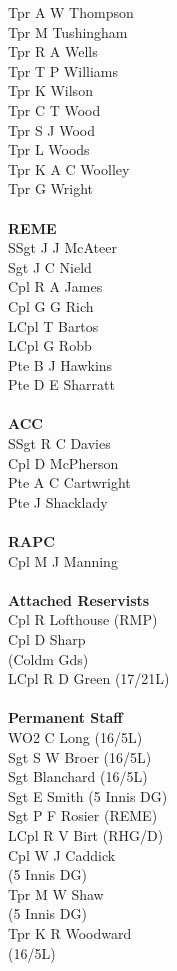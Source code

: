 \begin{multicols}{4}
  Tpr A W Thompson \\
  Tpr M Tushingham \\
  Tpr R A Wells \\
  Tpr T P Williams \\
  Tpr K Wilson \\
  Tpr C T Wood \\
  Tpr S J Wood \\
  Tpr L Woods \\
  Tpr K A C Woolley \\
  Tpr G Wright \\
  \\
  \textbf{REME} \\
  SSgt J J McAteer \\
  Sgt J C Nield \\
  Cpl R A James \\
  Cpl G G Rich \\
  LCpl T Bartos \\
  LCpl G Robb \\
  Pte B J Hawkins \\
  Pte D E Sharratt \\
  \\
  \textbf{ACC} \\
  SSgt R C Davies \\
  Cpl D McPherson \\
  Pte A C Cartwright \\
  Pte J Shacklady \\
  \\
  \textbf{RAPC} \\
  Cpl M J Manning \\
  \\
  \textbf{Attached Reservists} \\
  Cpl R Lofthouse (RMP) \\
  Cpl D Sharp \\ \indent (Coldm Gds) \\
  LCpl R D Green (17/21L) \\
  \\
  \textbf{Permanent Staff} \\
  WO2 C Long (16/5L) \\
  Sgt S W Broer (16/5L) \\
  Sgt Blanchard (16/5L) \\
  Sgt E Smith (5 Innis DG) \\
  Sgt P F Rosier (REME) \\
  LCpl R V Birt (RHG/D) \\
  Cpl W J Caddick \\ \indent (5 Innis DG) \\
  Tpr M W Shaw \\ \indent (5 Innis DG) \\
  Tpr K R Woodward \\ \indent (16/5L)
\end{multicols}

\pagebreak
